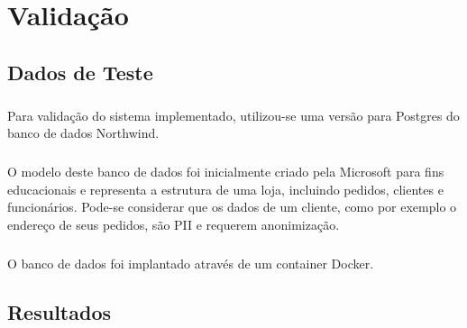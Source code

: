 \chapter{Validação}
\label{cap5}

\section{Dados de Teste}

\paragraph{} Para validação do sistema implementado, utilizou-se uma versão para Postgres do banco de dados Northwind\cite{northwindpg}.

\paragraph{} O modelo deste banco de dados foi inicialmente criado pela Microsoft para fins educacionais e representa a estrutura de uma loja, incluindo pedidos, clientes e funcionários. Pode-se considerar que os dados de um cliente, como por exemplo o endereço de seus pedidos, são PII e requerem anonimização.

\paragraph{} O banco de dados foi implantado através de um container Docker.

\section{Resultados}
